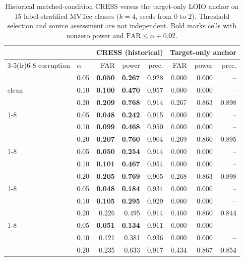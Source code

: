 \begin{table}[pos=t]
\centering
\caption{Historical matched-condition CRESS versus the target-only LOIO anchor on 15 label-stratified MVTec classes ($k{=}4$, seeds from 0 to 2). Threshold selection and source assessment are not independent. Bold marks cells with nonzero power and $\mathrm{FAR}\le\alpha{+}0.02$.}
\label{tab:sc3r-source-validated}
\footnotesize
\setlength{\tabcolsep}{3pt}
\begin{tabular}{llrrrrrr}
\toprule
 & & \multicolumn{3}{c}{CRESS (historical)} & \multicolumn{3}{c}{Target-only anchor} \\
\cmidrule(lr){3-5}\cmidrule(lr){6-8}
corruption & $\alpha$ & FAR & power & prec. & FAR & power & prec. \\
\midrule
\multirow{3}{*}{clean} & 0.05 & \textbf{0.050} & \textbf{0.267} & 0.928 & 0.000 & 0.000 & -- \\
 & 0.10 & \textbf{0.100} & \textbf{0.470} & 0.957 & 0.000 & 0.000 & -- \\
 & 0.20 & \textbf{0.209} & \textbf{0.768} & 0.914 & 0.267 & 0.863 & 0.898 \\
\cmidrule(lr){1-8}
\multirow{3}{*}{blur} & 0.05 & \textbf{0.048} & \textbf{0.242} & 0.915 & 0.000 & 0.000 & -- \\
 & 0.10 & \textbf{0.099} & \textbf{0.468} & 0.950 & 0.000 & 0.000 & -- \\
 & 0.20 & \textbf{0.207} & \textbf{0.760} & 0.904 & 0.269 & 0.860 & 0.895 \\
\cmidrule(lr){1-8}
\multirow{3}{*}{bright/contr.} & 0.05 & \textbf{0.050} & \textbf{0.254} & 0.914 & 0.000 & 0.000 & -- \\
 & 0.10 & \textbf{0.101} & \textbf{0.467} & 0.954 & 0.000 & 0.000 & -- \\
 & 0.20 & \textbf{0.205} & \textbf{0.769} & 0.905 & 0.268 & 0.863 & 0.898 \\
\cmidrule(lr){1-8}
\multirow{3}{*}{Gauss. noise} & 0.05 & \textbf{0.048} & \textbf{0.184} & 0.934 & 0.000 & 0.000 & -- \\
 & 0.10 & \textbf{0.105} & \textbf{0.295} & 0.929 & 0.000 & 0.000 & -- \\
 & 0.20 & 0.226 & 0.495 & 0.914 & 0.460 & 0.860 & 0.844 \\
\cmidrule(lr){1-8}
\multirow{3}{*}{JPEG} & 0.05 & \textbf{0.051} & \textbf{0.134} & 0.911 & 0.000 & 0.000 & -- \\
 & 0.10 & 0.121 & 0.381 & 0.936 & 0.000 & 0.000 & -- \\
 & 0.20 & 0.235 & 0.633 & 0.917 & 0.434 & 0.867 & 0.854 \\
\bottomrule
\end{tabular}
\end{table}
